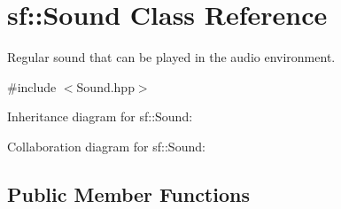 \hypertarget{classsf_1_1_sound}{}\section{sf\+:\+:Sound Class Reference}
\label{classsf_1_1_sound}


Regular sound that can be played in the audio environment.  




{\ttfamily \#include $<$Sound.\+hpp$>$}



Inheritance diagram for sf\+:\+:Sound\+:


Collaboration diagram for sf\+:\+:Sound\+:
\subsection*{Public Member Functions}
